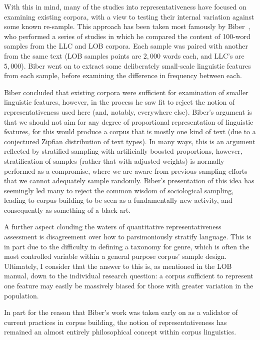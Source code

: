 With this in mind, many of the studies into representativeness have focused on examining existing corpora, with a view to testing their internal variation against some known re-sample.  This approach has been taken most famously by Biber~\cite{biber1993representativeness}, who performed a series of studies in which he compared the content of 100-word samples from the LLC and LOB corpora.  Each sample was paired with another from the same text (LOB samples points are $2,000$ words each, and LLC's are $5,000$).  Biber went on to extract some deliberately small-scale linguistic features from each sample, before examining the difference in frequency between each.


Biber concluded that existing corpora were sufficient for examination of smaller linguistic features, however, in the process he saw fit to reject the notion of representativeness used here (and, notably, everywhere else).  Biber's argument is that we should not aim for any degree of proportional representation of linguistic features, for this would produce a corpus that is mostly one kind of text (due to a conjectured Zipfian distribution of text types).  In many ways, this is an argument reflected by stratified sampling with artificially boosted proportions, however, stratification of samples (rather that with adjusted weights) is normally performed as a compromise, where we are aware from previous sampling efforts that we cannot adequately sample randomly.  Biber's presentation of this idea has seemingly led many to reject the common wisdom of sociological sampling, leading to corpus building to be seen as a fundamentally new activity, and consequently as something of a black art.


A further aspect clouding the waters of quantitative representativeness assessment is disagreement over how to parsimoniously stratify language.  This is in part due to the difficulty in defining a taxonomy for genre, which is often the most controlled variable within a general purpose corpus' sample design.  Ultimately, I consider that the answer to this is, as mentioned in the LOB manual, down to the individual research question: a corpus sufficient to represent one feature may easily be massively biased for those with greater variation in the population.



In part for the reason that Biber's work was taken early on as a validator of current practices in corpus building, the notion of representativeness has remained an almost entirely philosophical concept within corpus linguistics.%

